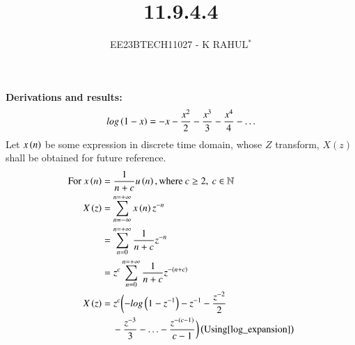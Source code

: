 \documentclass[journal,12pt,twocolumn]{IEEEtran}
\theoremstyle{remark}
\begin{document}

\vspace{3cm}
\title{11.9.4.4}
\author{EE23BTECH11027 - K RAHUL$^{*}$%
}
\maketitle
\newpage
\bigskip
\renewcommand{\thefigure}{\theenumi}
\renewcommand{\thetable}{\theenumi}
\textbf{Derivations and results:} \\
\begin{align}
        log\left(1-x\right) = -x - \frac{x^2}{2} - \frac{x^3}{3}-\frac{x^4}{4}- \ldots \label{log_expansion}
\end{align}
Let $x\left(n\right)$ be some expression in discrete time domain, whose $Z$ transform, $X(z)$ shall be obtained for future reference.\\
\begin{align}
	\notag\text{For } x\left(n\right) &= \frac{1}{n+c} u\left(n\right),\text{where} \: c \geq 2,\: c \in \mathbb{N}\\
    X\left(z\right) &= \sum_{n= -\infty}^{n= +\infty} x\left(n\right)z^{-n}\\
    &=\sum_{n = 0}^{n = +\infty} \frac{1}{n+c}z^{-n}\\
    &= z^c\sum_{n = 0}^{n = +\infty} \frac{1}{n+c}z^{-\left(n+c\right)} \\
    X\left(z\right)&= z^c \biggl(-log\left(1-z^{-1}\right)- z^{-1}-\frac{z^{-2}}{2}\notag \\& \;\;\;\;-\frac{z^{-3}}{3} - \ldots -\frac{z^{-(c-1)}}{c-1} \biggr) \left(\text{Using} \eqref{log_expansion}\right) \label{11027_eq1}
\end{align} 
\end{document}
